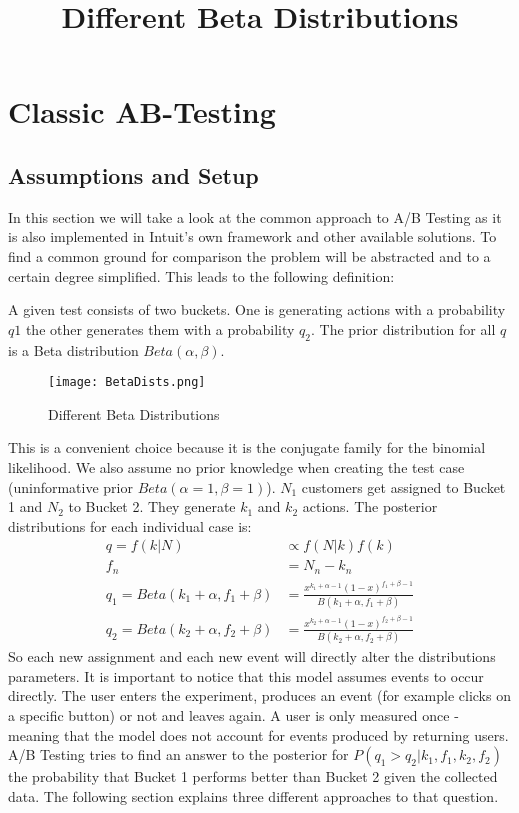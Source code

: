 \documentclass[../Thesis.tex]{subfiles}
\begin{document}
\chapter{Classic AB-Testing}

\section{Assumptions and Setup}
In this section we will take a look at the common approach to A/B Testing as it is also implemented in Intuit's own framework and other available solutions. To find a common ground for comparison the problem will be abstracted and to a certain degree simplified. This leads to the following definition:

A given test consists of two buckets. One is generating actions with a probability $q1$ the other generates them with a probability $q_2$. The prior distribution for all $q$ is a Beta distribution $Beta(\alpha,\beta)$.
\begin{figure}[h]
\texttt{[image: BetaDists.png]}
\centering
\title{Different Beta Distributions}
\caption{Different Beta Distributions}
\end{figure}
This is a convenient choice because it is the conjugate family for the binomial likelihood. 
We also assume no prior knowledge when creating the test case (uninformative prior $Beta(\alpha=1,\beta=1)$). $N_1$ customers get assigned to Bucket 1 and $N_2$ to Bucket 2. They generate $k_1$ and $k_2$ actions. The posterior distributions for each individual case is:
\begin{align*}
q = f(k|N) &\propto f(N|k)f(k)\\
f_n &= N_n-k_n \\
q_1 = Beta(k_1+\alpha,f_1+\beta) & = \frac{x^{k_1+\alpha-1}(1-x)^{f_1+\beta -1}}{B(k_1+\alpha,f_1+\beta)} \\
q_2 = Beta(k_2+\alpha,f_2+\beta) & = \frac{x^{k_2+\alpha-1}(1-x)^{f_2+\beta -1}}{B(k_2+\alpha,f_2+\beta)}
\end{align*}
So each new assignment and each new event will directly alter the distributions parameters. It is important to notice that this model assumes events to occur directly. The user enters the experiment, produces an event (for example clicks on a specific button) or not and leaves again. A user is only measured once - meaning that the model does not account for events produced by returning users.
A/B Testing tries to find an answer to the posterior for $P(q_1>q_2 | k_1,f_1,k_2,f_2)$ the probability that Bucket 1 performs better than Bucket 2 given the collected data. The following section explains three different approaches to that question.
\end{document}
